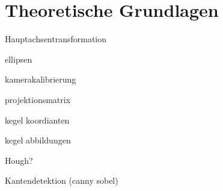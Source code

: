 \chapter{Theoretische Grundlagen}


Hauptachsentransformation

ellipsen

kamerakalibrierung

projektionsmatrix

kegel koordianten

kegel abbildungen

Hough?


Kantendetektion (canny sobel)
